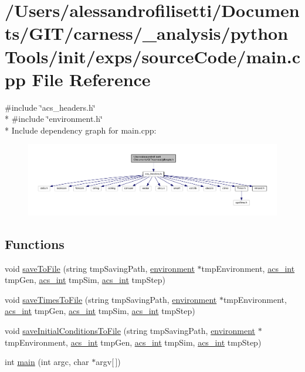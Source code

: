 \hypertarget{a00068}{\section{/\-Users/alessandrofilisetti/\-Documents/\-G\-I\-T/carness/\-\_\-analysis/python\-Tools/init/exps/source\-Code/main.cpp File Reference}
\label{a00068}
}
{\ttfamily \#include \char`\"{}acs\-\_\-headers.\-h\char`\"{}}\\*
{\ttfamily \#include \char`\"{}environment.\-h\char`\"{}}\\*
Include dependency graph for main.\-cpp\-:
\nopagebreak
\begin{figure}[H]
\begin{center}
\leavevmode
\includegraphics[width=350pt]{a00188}
\end{center}
\end{figure}
\subsection*{Functions}
\begin{DoxyCompactItemize}
\item 
void \hyperlink{a00068_acac21f7e718db9d00451e3caaaacc25f}{save\-To\-File} (string tmp\-Saving\-Path, \hyperlink{a00014}{environment} $\ast$tmp\-Environment, \hyperlink{a00050_a8d277355641a098190360234e2ebde35}{acs\-\_\-int} tmp\-Gen, \hyperlink{a00050_a8d277355641a098190360234e2ebde35}{acs\-\_\-int} tmp\-Sim, \hyperlink{a00050_a8d277355641a098190360234e2ebde35}{acs\-\_\-int} tmp\-Step)
\item 
void \hyperlink{a00068_a2bf310904bc4e1fb5669e548525c4ba7}{save\-Times\-To\-File} (string tmp\-Saving\-Path, \hyperlink{a00014}{environment} $\ast$tmp\-Environment, \hyperlink{a00050_a8d277355641a098190360234e2ebde35}{acs\-\_\-int} tmp\-Gen, \hyperlink{a00050_a8d277355641a098190360234e2ebde35}{acs\-\_\-int} tmp\-Sim, \hyperlink{a00050_a8d277355641a098190360234e2ebde35}{acs\-\_\-int} tmp\-Step)
\item 
void \hyperlink{a00068_a4665c5f33b43dfc8fae4757552028cc0}{save\-Initial\-Conditions\-To\-File} (string tmp\-Saving\-Path, \hyperlink{a00014}{environment} $\ast$tmp\-Environment, \hyperlink{a00050_a8d277355641a098190360234e2ebde35}{acs\-\_\-int} tmp\-Gen, \hyperlink{a00050_a8d277355641a098190360234e2ebde35}{acs\-\_\-int} tmp\-Sim, \hyperlink{a00050_a8d277355641a098190360234e2ebde35}{acs\-\_\-int} tmp\-Step)
\item 
int \hyperlink{a00068_a0ddf1224851353fc92bfbff6f499fa97}{main} (int argc, char $\ast$argv\mbox{[}$\,$\mbox{]})
\end{DoxyCompactItemize}


